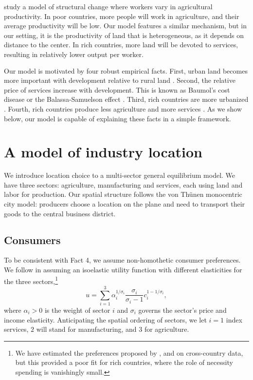 \documentclass[12pt]{article}
\begin{document}
 study a model of structural change where workers vary in agricultural productivity. In poor countries, more people will work in agriculture, and their average productivity will be low. Our model features a similar mechanism, but in our setting, it is the productivity of land that is heterogeneous, as it depends on distance to the center. In rich countries, more land will be devoted to services, resulting in relatively lower output per worker.

Our model is motivated by four robust empirical facts. First, urban land becomes more important with development relative to rural land \cite[Figure 10.3]{Clark}. Second, the relative price of services increase with development. This is known as Baumol's cost disease \cite{Baumol65} or the Balassa-Samuelson effect \cite{Balassa64,Samuelson64}. Third, rich countries are more urbanized \cite{United_Nations2014-zm}. Fourth, rich countries produce less agriculture and more services \cite{Kuznets1973,Ngai2007,Kongsamut2001}. As we show below, our model is capable of explaining these facts in a simple framework.


\section{A model of industry location}
We introduce location choice to a multi-sector general equilibrium model. We have three sectors: agriculture, manufacturing and services, each using land and labor for production. Our spatial structure follows the von Thünen monocentric city model: producers choose a location on the plane and need to transport their goods to the central business district. %

\subsection{Consumers}
To be consistent with Fact 4, we assume non-homothetic consumer preferences. We follow  in assuming an isoelastic utility function with different elasticities for the three sectors,\footnote{We have estimated the preferences proposed by ,  and  on cross-country data, but this provided a poor fit for rich countries, where the role of necessity spending is vanishingly small.}
\begin{equation}
\label{eq:Utility}
u = \sum_{i=1}^3\alpha_i^{1/\sigma_i}
	\frac {\sigma_i}
			{\sigma_i-1}
	c_i^{1-1/\sigma_i},
\end{equation}
where $\alpha_i>0$ is the weight of sector $i$ and $\sigma_i$ governs the sector's price and income elasticity. Anticipating the spatial ordering of sectors, we let $i=1$ index services, $2$ will stand for manufacturing, and $3$ for agriculture.
\end{document}
